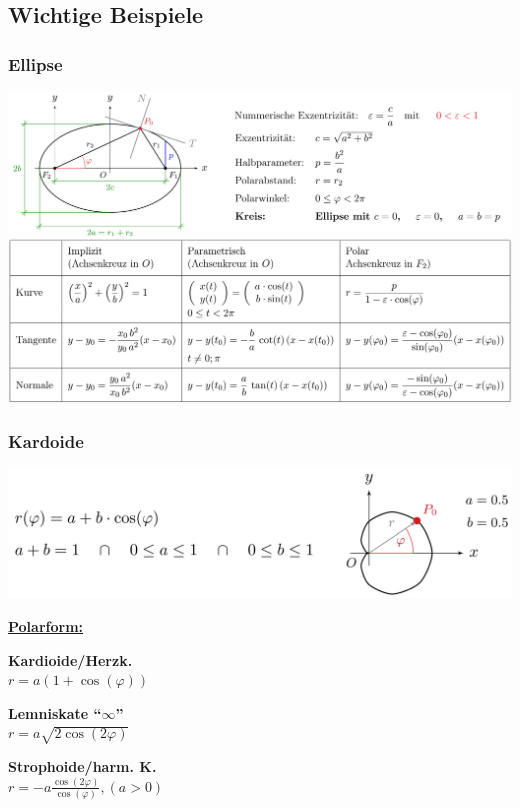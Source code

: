 \subsection{Wichtige Beispiele } %
	\subsubsection{Ellipse {}} %
		\includegraphics[width=1\textwidth]{bilder/ellipse.png}
	\subsubsection{Kardoide {}} %
		\begin{minipage}{.6\textwidth}
			\includegraphics[width=1\textwidth]{bilder/kardoide.png}
		\end{minipage}
		\hspace{5mm}
		\begin{minipage}{.4\textwidth}
			\parbox{2.7cm}{
				\underline{\textbf{Polarform:}} \\
			}
			
			\parbox{5cm}{
				\textbf{Kardioide/Herzk. } \\ %
				$r = a(1+\cos(\varphi))$
			}
			
			\parbox{5cm}{
				\textbf{Lemniskate ``$\infty$'' } \\ %
				$r = a\sqrt{2\cos(2\varphi)}$ 
			}
			
			\parbox{5cm}{
				\textbf{Strophoide/harm. K. } \\ %
				$ r = -a \frac{\cos(2\varphi)}{\cos(\varphi)},(a>0) $ 
			}
		\end{minipage}
